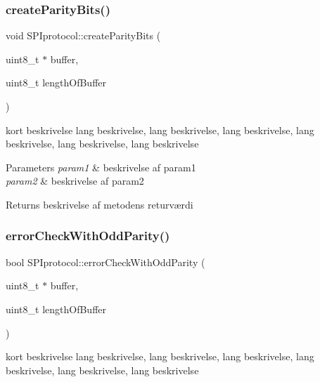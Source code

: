 \subsubsection{\texorpdfstring{create\+Parity\+Bits()}{createParityBits()}}
{\footnotesize\ttfamily void S\+P\+Iprotocol\+::create\+Parity\+Bits (\begin{DoxyParamCaption}\item[{uint8\+\_\+t $\ast$}]{buffer,  }\item[{uint8\+\_\+t}]{length\+Of\+Buffer }\end{DoxyParamCaption})\hspace{0.3cm}{\ttfamily [static]}}



kort beskrivelse lang beskrivelse, lang beskrivelse, lang beskrivelse, lang beskrivelse, lang beskrivelse, lang beskrivelse 


\begin{DoxyParams}{Parameters}
{\em param1} & beskrivelse af param1 \\
\hline
{\em param2} & beskrivelse af param2 \\
\hline
\end{DoxyParams}
\begin{DoxyReturn}{Returns}
beskrivelse af metodens returværdi 
\end{DoxyReturn}
\mbox{\label{classSPIprotocol_aa263c4525c227602aa55d0fe34cd2d0e}} 
\subsubsection{\texorpdfstring{error\+Check\+With\+Odd\+Parity()}{errorCheckWithOddParity()}}
{\footnotesize\ttfamily bool S\+P\+Iprotocol\+::error\+Check\+With\+Odd\+Parity (\begin{DoxyParamCaption}\item[{uint8\+\_\+t $\ast$}]{buffer,  }\item[{uint8\+\_\+t}]{length\+Of\+Buffer }\end{DoxyParamCaption})\hspace{0.3cm}{\ttfamily [static]}}



kort beskrivelse lang beskrivelse, lang beskrivelse, lang beskrivelse, lang beskrivelse, lang beskrivelse, lang beskrivelse 


